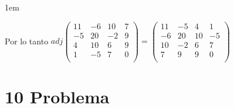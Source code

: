 \documentclass[12pt, fleqn]{article}                             %
\newenvironment{SmallIndentation}[1][0.75em]                    %
        {\begin{adjustwidth}{#1}{}\begin{footnotesize}}             %
        {\end{footnotesize}\end{adjustwidth}}                       %
\theoremstyle{break}                                            %
\newcommand{\pVector}[1]                                        %
        { \ensuremath{\begin{pmatrix}#1\end{pmatrix}} }             %
\begin{document}
\begin{itemize}
\begin{SmallIndentation}[1em]
\begin{itemize}
                \end{itemize}

                Por lo tanto $adj \pVector{
                11 & -6 & 10 & 7   \\ 
                -5 & 20 & -2 & 9   \\
                4  & 10 & 6 & 9    \\
                1  & -5 & 7 & 0    \\
                } = 
                \pVector{
                11 & -5 & 4  & 1  \\
                -6 & 20 & 10 & -5 \\
                10 & -2 &  6 & 7  \\
                7  & 9  &  9 & 0  \\
                }$
                    
            \end{SmallIndentation}


    \end{itemize}







\clearpage
\section{10 Problema}
\end{document}
